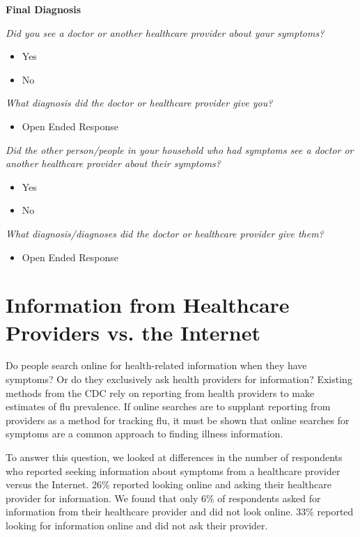 \documentclass[12pt]{article}
\begin{document}
\textbf{Final Diagnosis}

\emph{Did you see a doctor or another healthcare provider about your symptoms?}
\begin{itemize}
\item Yes
\item No
\end{itemize}

\emph{What diagnosis did the doctor or healthcare provider give you?}
\begin{itemize}
\item Open Ended Response
\end{itemize}
 
\emph{Did the other person/people in your household who had symptoms see a doctor or another healthcare provider about their symptoms?}
\begin{itemize}
\item Yes
\item No
\end{itemize}

\emph{What diagnosis/diagnoses did the doctor or healthcare provider give them?}
\begin{itemize}
\item Open Ended Response
\end{itemize}




\section{Information from Healthcare Providers vs. the Internet}

Do people search online for health-related information when they have symptoms? Or do they exclusively ask health providers for information? Existing methods from the CDC rely on reporting from health providers to make estimates of flu prevalence. If online searches are to supplant reporting from providers as a method for tracking flu, it must be shown that online searches for symptoms are a common approach to finding illness information. 

To answer this question, we looked at differences in the number of respondents who reported seeking information about symptoms from a healthcare provider versus the Internet. 26\% reported looking online and asking their healthcare provider for information. We found that only 6\% of respondents asked for information from their healthcare provider and did not look online. 33\% reported looking for information online and did not ask their provider. 
\end{document}
